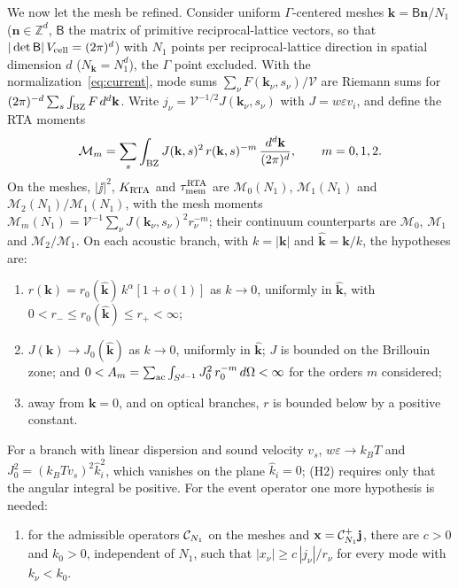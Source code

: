 We now let the mesh be refined. Consider uniform $\Gamma$-centered meshes $\mathbf k=\mathsf B\mathbf n/N_1$
($\mathbf n\in\mathbb Z^d$, $\mathsf B$ the matrix of primitive reciprocal-lattice vectors, so that
$|\det\mathsf B|\,V_{\rm cell}=(2\pi)^d$) with $N_1$ points per reciprocal-lattice direction in spatial
dimension $d$ ($N_{\mathbf k}=N_1^d$), the $\Gamma$ point excluded. With the normalization~\eqref{eq:current}, mode sums $\sum_\nu F(\mathbf k_\nu,s_\nu)/\mathcal V$
are Riemann sums for $(2\pi)^{-d}\sum_s\int_{\rm BZ}F\,d^d\mathbf k$. Write $j_\nu=\mathcal V^{-1/2}J(\mathbf k_\nu,s_\nu)$
with $J=w\varepsilon v_i$, and define the RTA moments
\begin{equation}
\mathcal M_m=\sum_s\int_{\rm BZ}J(\mathbf k,s)^2\,r(\mathbf k,s)^{-m}\,\frac{d^d\mathbf k}{(2\pi)^d},\qquad m=0,1,2.
\label{eq:Mm}
\end{equation}
On the meshes, $|\jj|^2$, $K_{\rm RTA}$ and $\tau_{\rm mem}^{\rm RTA}$ are $\mathcal M_0(N_1)$, $\mathcal M_1(N_1)$
and $\mathcal M_2(N_1)/\mathcal M_1(N_1)$, with the mesh moments
$\mathcal M_m(N_1)=\mathcal V^{-1}\sum_\nu J(\mathbf k_\nu,s_\nu)^2r_\nu^{-m}$; their continuum counterparts are
$\mathcal M_0$, $\mathcal M_1$ and $\mathcal M_2/\mathcal M_1$.
On each acoustic branch, with $k=|\mathbf k|$ and $\hat{\mathbf k}=\mathbf k/k$, the hypotheses are:
\begin{enumerate}
\item[(H1)] $r(\mathbf k)=r_0(\hat{\mathbf k})\,k^\alpha[1+o(1)]$ as $k\to0$, uniformly in $\hat{\mathbf k}$, with
$0<r_-\le r_0(\hat{\mathbf k})\le r_+<\infty$;
\item[(H2)] $J(\mathbf k)\to J_0(\hat{\mathbf k})$ as $k\to0$, uniformly in $\hat{\mathbf k}$; $J$ is bounded on the
Brillouin zone; and $0<A_m=\sum_{\rm ac}\int_{S^{d-1}}J_0^2\,r_0^{-m}\,d\Omega<\infty$ for the orders $m$ considered;
\item[(H3)] away from $\mathbf k=0$, and on optical branches, $r$ is bounded below by a positive constant.
\end{enumerate}
For a branch with linear dispersion and sound velocity $v_s$, $w\varepsilon\to k_BT$ and
$J_0^2=(k_BTv_s)^2\hat k_i^2$, which vanishes on the plane $\hat k_i=0$; (H2) requires only that the
angular integral be positive. For the event operator one more hypothesis is needed:
\begin{enumerate}
\item[(H4)] for the admissible operators $\mathcal C_{N_1}$ on the meshes and $\mathbf x=\mathcal C_{N_1}^+\mathbf j$, there are
$c>0$ and $k_0>0$, independent of $N_1$, such that $|x_\nu|\ge c\,|j_\nu|/r_\nu$ for every mode with
$k_\nu<k_0$.
\end{enumerate}
